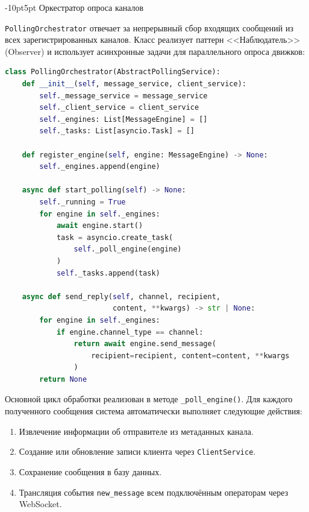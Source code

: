 \documentclass[12pt,a4paper]{report}
\makeatletter
\renewcommand{\subsection}{%
  \@startsection{subsection}{2}{\z@}%
  {-10pt}{5pt}%
  {\normalfont\bfseries\large}}
\makeatother
\begin{document}
\subsection{Оркестратор опроса каналов}

\texttt{PollingOrchestrator} отвечает за непрерывный сбор входящих сообщений из всех зарегистрированных каналов. Класс реализует паттерн <<Наблюдатель>> (Observer) и использует асинхронные задачи для параллельного опроса движков:

\begin{lstlisting}[language=Python]
class PollingOrchestrator(AbstractPollingService):
    def __init__(self, message_service, client_service):
        self._message_service = message_service
        self._client_service = client_service
        self._engines: List[MessageEngine] = []
        self._tasks: List[asyncio.Task] = []

    def register_engine(self, engine: MessageEngine) -> None:
        self._engines.append(engine)

    async def start_polling(self) -> None:
        self._running = True
        for engine in self._engines:
            await engine.start()
            task = asyncio.create_task(
                self._poll_engine(engine)
            )
            self._tasks.append(task)

    async def send_reply(self, channel, recipient,
                         content, **kwargs) -> str | None:
        for engine in self._engines:
            if engine.channel_type == channel:
                return await engine.send_message(
                    recipient=recipient, content=content, **kwargs
                )
        return None
\end{lstlisting}

Основной цикл обработки реализован в методе \texttt{\_poll\_engine()}. Для каждого полученного сообщения система автоматически выполняет следующие действия:

\begin{enumerate}
    \item Извлечение информации об отправителе из метаданных канала.
    \item Создание или обновление записи клиента через \texttt{ClientService}.
    \item Сохранение сообщения в базу данных.
    \item Трансляция события \texttt{new\_message} всем подключённым операторам через WebSocket.
\end{enumerate}
\end{document}
